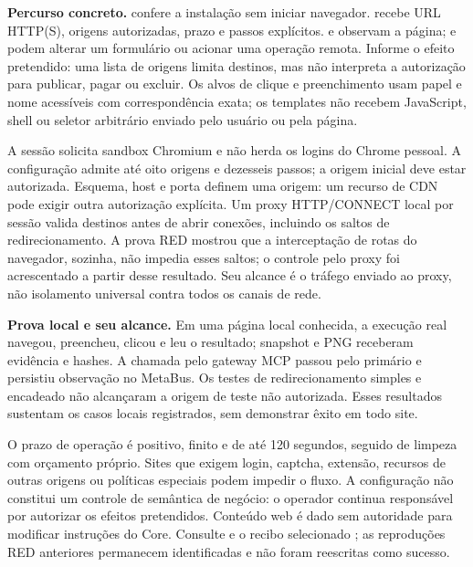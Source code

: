 \begin{metodo}
\textbf{Percurso concreto.}  confere a instalação sem
iniciar navegador.  recebe URL HTTP(S), origens
autorizadas, prazo e passos explícitos.  e  observam
a página;  e  podem alterar um formulário ou acionar uma
operação remota. Informe o efeito pretendido: uma lista de origens limita
destinos, mas não interpreta a autorização para publicar, pagar ou excluir.
Os alvos de clique e preenchimento usam papel e nome acessíveis com
correspondência exata; os templates não recebem JavaScript, shell ou seletor
arbitrário enviado pelo usuário ou pela página.
\end{metodo}

\begin{arquitetura}
A sessão solicita sandbox Chromium e não herda os logins do Chrome pessoal.
A configuração admite até oito origens e dezesseis passos; a origem inicial
deve estar autorizada. Esquema, host e porta definem uma origem: um recurso
de CDN pode exigir outra autorização explícita. Um proxy HTTP/CONNECT local
por sessão valida destinos antes de abrir conexões, incluindo os saltos de
redirecionamento. A prova RED mostrou que a interceptação de rotas do navegador,
sozinha, não impedia esses saltos; o controle pelo proxy foi acrescentado a partir
desse resultado. Seu alcance é o tráfego enviado ao proxy, não isolamento
universal contra todos os canais de rede.
\end{arquitetura}

\begin{resultado}
\textbf{Prova local e seu alcance.} Em uma página local conhecida, a execução
real navegou, preencheu, clicou e leu o resultado; snapshot e PNG receberam
evidência e hashes. A chamada pelo gateway MCP passou pelo primário e persistiu
observação no MetaBus. Os testes de redirecionamento simples e encadeado não
alcançaram a origem de teste não autorizada. Esses resultados sustentam os
casos locais registrados, sem demonstrar êxito em todo site.
\end{resultado}

\begin{limite}
O prazo de operação é positivo, finito e de até 120 segundos, seguido de
limpeza com orçamento próprio. Sites que exigem login, captcha, extensão,
recursos de outras origens ou políticas especiais podem impedir o fluxo.
A configuração não constitui um controle de semântica de negócio: o operador
continua responsável por autorizar os efeitos pretendidos. Conteúdo web é dado
sem autoridade para modificar instruções do Core. Consulte
 e o recibo selecionado
; as reproduções RED anteriores
permanecem identificadas e não foram reescritas como sucesso.
\end{limite}


